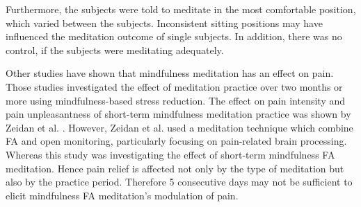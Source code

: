 Furthermore, the subjects were told to meditate in the most comfortable position, which varied between the subjects. Inconsistent sitting positions may have influenced the meditation outcome of single subjects. In addition, there was no control, if the subjects were meditating adequately.

Other studies have shown that mindfulness meditation has an effect on pain. Those studies investigated the effect of meditation practice over two months or more using mindfulness-based stress reduction. \cite{Kabat1982,Rosenzweig2010} The effect on pain intensity and pain unpleasantness of short-term mindfulness meditation practice was shown by Zeidan et al. \cite{Zeidan2012}. However, Zeidan et al. \cite{Zeidan2012} used a meditation technique which combine FA and open monitoring, particularly focusing on pain-related brain processing. Whereas this study was investigating the effect of short-term mindfulness FA meditation. Hence pain relief is affected not only by the type of meditation but also by the practice period. Therefore 5 consecutive days may not be sufficient to elicit mindfulness FA meditation’s modulation of pain.